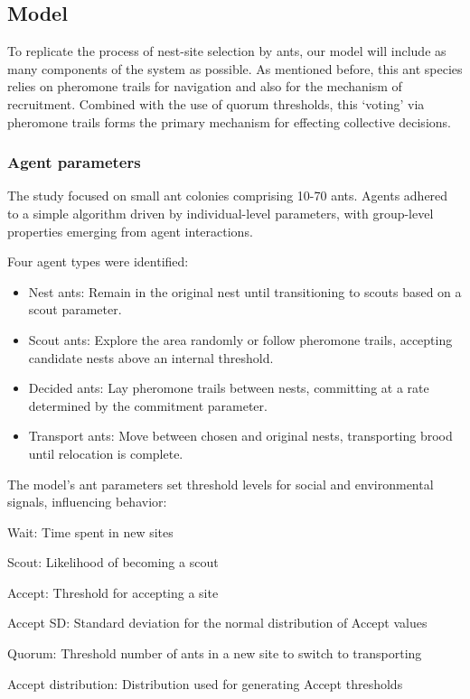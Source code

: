 \documentclass{article}
\begin{document}
\subsection{Model}

To replicate the process of nest-site selection by ants, our model will include as many components of the system as possible.
As mentioned before, this ant species relies on pheromone trails for navigation and also for the mechanism of recruitment. Combined with the use of quorum thresholds, this ‘voting’ via pheromone trails forms the primary mechanism for effecting collective decisions. 

 
\subsubsection{Agent parameters}
The study focused on small ant colonies comprising 10-70 ants. Agents adhered to a simple algorithm driven by individual-level parameters, with group-level properties emerging from agent interactions.

Four agent types were identified:

\begin{itemize}
    \item Nest ants: Remain in the original nest until transitioning to scouts based on a scout parameter.
    \item Scout ants: Explore the area randomly or follow pheromone trails, accepting candidate nests above an internal threshold.
    \item Decided ants: Lay pheromone trails between nests, committing at a rate determined by the commitment parameter.
    \item Transport ants: Move between chosen and original nests, transporting brood until relocation is complete.
\end{itemize}
The model's ant parameters set threshold levels for social and environmental signals, influencing behavior:

Wait: Time spent in new sites

Scout: Likelihood of becoming a scout

Accept: Threshold for accepting a site

Accept SD: Standard deviation for the normal distribution of Accept values

Quorum: Threshold number of ants in a new site to switch to transporting

Accept distribution: Distribution used for generating Accept thresholds
\end{document}
